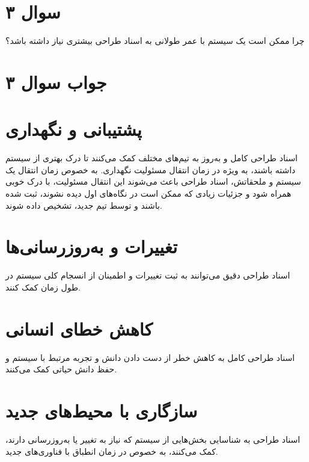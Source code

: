 \section*{سوال ۳}

چرا ممکن است یک سیستم با عمر طولانی به اسناد طراحی بیشتری نیاز داشته باشد؟

\section*{جواب سوال ۳}

\section*{پشتیبانی و نگهداری}
اسناد طراحی کامل و به‌روز به تیم‌های مختلف کمک می‌کنند تا درک بهتری از سیستم داشته باشند، به ویژه در زمان انتقال مسئولیت نگهداری. به خصوص زمان انتقال یک سیستم و ملحقاتش، اسناد طراحی باعث می‌شوند این انتقال مسئولیت، با درک خوبی همراه شود و جزئیات زیادی که ممکن است در نگاه‌های اول دیده نشوند، ثبت شده باشند و توسط تیم جدید، تشخیص داده شوند.

\section*{تغییرات و به‌روزرسانی‌ها}
اسناد طراحی دقیق می‌توانند به ثبت تغییرات و اطمینان از انسجام کلی سیستم در طول زمان کمک کنند.

\section*{کاهش خطای انسانی}
اسناد طراحی کامل به کاهش خطر از دست دادن دانش و تجربه مرتبط با سیستم و حفظ دانش حیاتی کمک می‌کنند.

\section*{سازگاری با محیط‌های جدید}
اسناد طراحی به شناسایی بخش‌هایی از سیستم که نیاز به تغییر یا به‌روزرسانی دارند، کمک می‌کنند، به خصوص در زمان انطباق با فناوری‌های جدید.